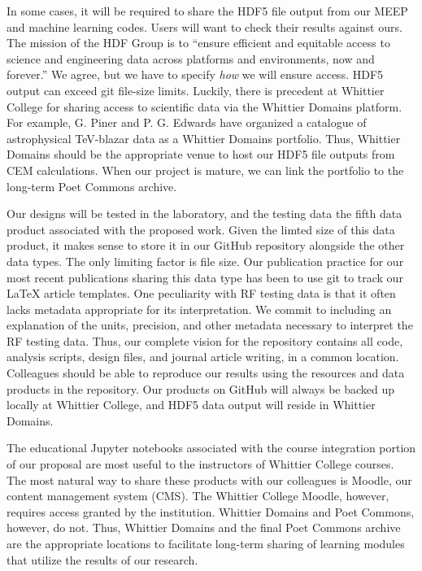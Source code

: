 \documentclass[10pt]{amsart}
\theoremstyle{definition}
\numberwithin{equation}{section}
\begin{document}
In some cases, it will be required to share the HDF5 file output from our MEEP and machine learning codes.  Users will want to check their results against ours.  The mission of the HDF Group is to ``ensure efficient and equitable access to science and engineering data across platforms and environments, now and forever.''  We agree, but we have to specify \textit{how} we will ensure access.  HDF5 output can exceed git file-size limits.  Luckily, there is precedent at Whittier College for sharing access to scientific data via the Whittier Domains platform.  For example, G. Piner and P. G. Edwards have organized a catalogue of astrophysical TeV-blazar data as a Whittier Domains portfolio.  Thus, Whittier Domains should be the appropriate venue to host our HDF5 file outputs from CEM calculations.  When our project is mature, we can link the portfolio to the long-term Poet Commons archive.  

Our designs will be tested in the laboratory, and the testing data the fifth data product associated with the proposed work.  Given the limted size of this data product, it makes sense to store it in our GitHub repository alongside the other data types.  The only limiting factor is file size.  Our publication practice for our most recent publications sharing this data type has been to use git to track our LaTeX article templates.  One peculiarity with RF testing data is that it often lacks metadata appropriate for its interpretation.  We commit to including an explanation of the units, precision, and other metadata necessary to interpret the RF testing data.  Thus, our complete vision for the repository contains all code, analysis scripts, design files, and journal article writing, in a common location.  Colleagues should be able to reproduce our results using the resources and data products in the repository.  Our products on GitHub will always be backed up locally at Whittier College, and HDF5 data output will reside in Whittier Domains.  

The educational Jupyter notebooks associated with the course integration portion of our proposal are most useful to the instructors of Whittier College courses.  The most natural way to share these products with our colleagues is Moodle, our content management system (CMS).  The Whittier College Moodle, however, requires access granted by the institution.  Whittier Domains and Poet Commons, however, do not.  Thus, Whittier Domains and the final Poet Commons archive are the appropriate locations to facilitate long-term sharing of learning modules that utilize the results of our research. 
\end{document}
